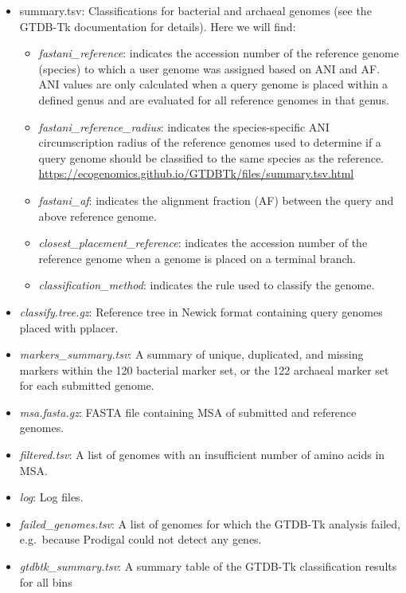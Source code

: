 \documentclass[
]{book}
\providecommand{\tightlist}{%
  \setlength{\itemsep}{0pt}\setlength{\parskip}{0pt}}
\begin{document}
\begin{itemize}
\tightlist
\item
  summary.tsv: Classifications for bacterial and archaeal genomes (see the GTDB-Tk documentation for details). Here we will find:

  \begin{itemize}
  \tightlist
  \item
    \emph{fastani\_reference}: indicates the accession number of the reference genome (species) to which a user genome was assigned based on ANI and AF. ANI values are only calculated when a query genome is placed within a defined genus and are evaluated for all reference genomes in that genus.
  \item
    \emph{fastani\_reference\_radius}: indicates the species-specific ANI circumscription radius of the reference genomes used to determine if a query genome should be classified to the same species as the reference.
    \url{https://ecogenomics.github.io/GTDBTk/files/summary.tsv.html}
  \item
    \emph{fastani\_af}: indicates the alignment fraction (AF) between the query and above reference genome.
  \item
    \emph{closest\_placement\_reference}: indicates the accession number of the reference genome when a genome is placed on a terminal branch.
  \item
    \emph{classification\_method}: indicates the rule used to classify the genome.
  \end{itemize}
\item
  \emph{classify.tree.gz}: Reference tree in Newick format containing query genomes placed with pplacer.
\item
  \emph{markers\_summary.tsv}: A summary of unique, duplicated, and missing markers within the 120 bacterial marker set, or the 122 archaeal marker set for each submitted genome.
\item
  \emph{msa.fasta.gz}: FASTA file containing MSA of submitted and reference genomes.
\item
  \emph{filtered.tsv}: A list of genomes with an insufficient number of amino acids in MSA.
\item
  \emph{log}: Log files.
\item
  \emph{failed\_genomes.tsv}: A list of genomes for which the GTDB-Tk analysis failed, e.g.~because Prodigal could not detect any genes.
\item
  \emph{gtdbtk\_summary.tsv}: A summary table of the GTDB-Tk classification results for all bins
\end{itemize}
\end{document}
